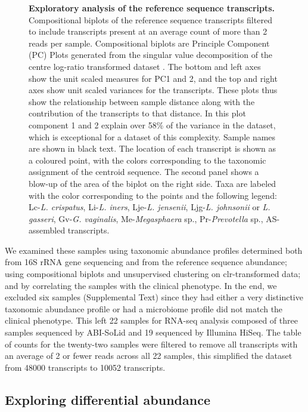 \documentclass[10pt,letterpaper]{article}
\begin{document}
\begin{figure}[h]
\caption{{\bf Exploratory analysis of the reference sequence transcripts.}
Compositional biplots of the reference sequence transcripts filtered to include transcripts present at an average count of more than 2 reads per sample. Compositional biplots are Principle Component (PC) Plots generated from the singular value decomposition of the centre log-ratio transformed dataset \cite{aitchison2002biplots}. The bottom and left axes show the unit scaled measures for PC1 and 2, and the top and right axes show unit scaled variances for the transcripts. These plots thus show the relationship between sample distance along with the contribution of the transcripts to that distance. In this plot component 1 and 2 explain over 58\% of the variance in the dataset, which is exceptional for a dataset of this complexity. Sample names are shown in black text. The location of each transcript is shown as a coloured point, with the colors corresponding to the taxonomic assignment of the centroid sequence. The second panel shows a blow-up of the area of the biplot on the right side. Taxa are labeled with the  color corresponding to the points and the following legend: Lc-\emph{L. crispatus},  Li-\emph{L. iners},  Lje-\emph{L. jensenii}, Ljg-\emph{L. johnsonii} or \emph{L. gasseri}, Gv-\emph{G. vaginalis}, Me-\emph{Megasphaera} sp., Pr-\emph{Prevotella} sp., AS- assembled transcripts. }
\label{F1:refseq_biplot}
\end{figure}

We examined these samples using taxonomic abundance profiles determined both from 16S rRNA gene sequencing and from the reference sequence abundance; using  compositional biplots and unsupervised clustering on clr-transformed data; and by correlating the samples with the clinical phenotype. In the end, we excluded six samples  (Supplemental Text) since they had either a very distinctive taxonomic abundance profile or had a microbiome profile did not match the clinical phenotype. This left 22 samples for RNA-seq analysis composed of three samples sequenced by ABI-SoLid and 19 sequenced by Illumina HiSeq. The table of counts for the twenty-two samples were filtered to remove all transcripts with an average of 2 or fewer reads across all 22 samples, this simplified the dataset from 48000 transcripts to 10052 transcripts. 


\subsection{Exploring differential abundance}
\end{document}
